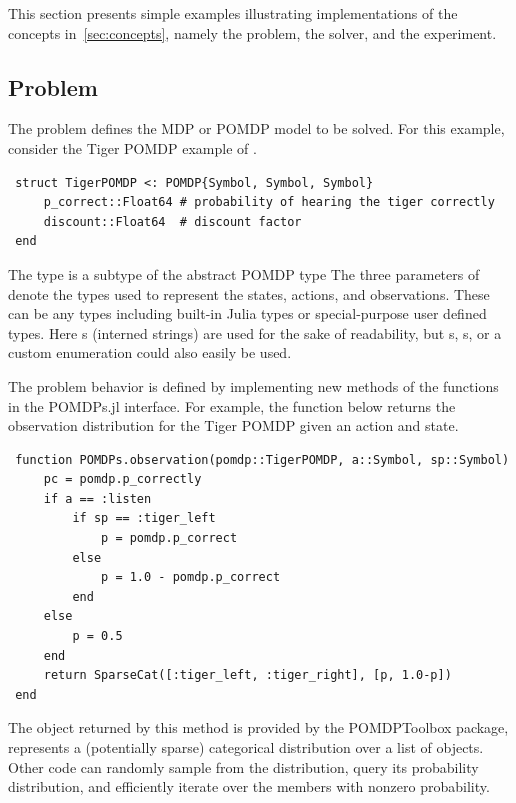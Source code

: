 This section presents simple examples illustrating implementations of the concepts in~\cref{sec:concepts}, namely the problem, the solver, and the experiment. 

\lstset{escapechar=@,style=customjulia}

\subsection{Problem}

The problem defines the MDP or POMDP model to be solved.
For this example, consider the Tiger POMDP example of \citet{kaelbling1998planning}.

\begin{lstlisting}
 struct TigerPOMDP <: POMDP{Symbol, Symbol, Symbol}
     p_correct::Float64 # probability of hearing the tiger correctly
     discount::Float64  # discount factor
 end
\end{lstlisting}
%
The  type is a subtype of the abstract {\small\ttfamily POMDP} type 
The three parameters of  denote the types used to represent the states, actions, and observations.
These can be any types including built-in Julia types or special-purpose user defined types.
Here s (interned strings) are used for the sake of readability, but s, s, or a custom enumeration could also easily be used.
 
The problem behavior is defined by implementing new methods of the functions in the POMDPs.jl interface.
For example, the function below returns the observation distribution for the Tiger POMDP given an action and state.

\begin{lstlisting}
 function POMDPs.observation(pomdp::TigerPOMDP, a::Symbol, sp::Symbol)
     pc = pomdp.p_correctly
     if a == :listen
         if sp == :tiger_left
             p = pomdp.p_correct
         else
             p = 1.0 - pomdp.p_correct
         end
     else
         p = 0.5
     end
     return SparseCat([:tiger_left, :tiger_right], [p, 1.0-p])
 end
\end{lstlisting}

The  object returned by this method is provided by the POMDPToolbox package, represents a (potentially sparse) categorical distribution over a list of objects.
Other code can randomly sample from the  distribution, query its probability distribution, and efficiently iterate over the members with nonzero probability.

